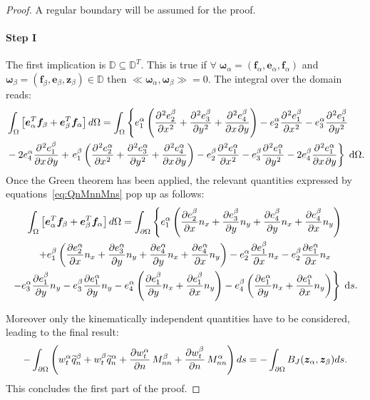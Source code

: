 \documentclass[11pt]{article}
\begin{document}
	\begin{proof}
		A regular boundary will be assumed for the proof.
		\paragraph{\textbf{Step I}} 
		The first implication is $\mathbb{D} \subseteq \mathbb{D}^T$. This is true if $ \forall \;\bm\omega_\alpha = (\bm{f}_\alpha, \bm{e}_\alpha, \bm{f}_\alpha)$ and $\bm\omega_\beta = (\bm{f}_\beta, \bm{e}_\beta, \bm{z}_\beta) \in \mathbb{D}$ then $\ll \bm\omega_\alpha, \bm\omega_\beta \gg = 0$. The integral over the domain reads:
		\begin{align*}
		&\int_{\Omega}  \left[ \bm{e}_\alpha^T \bm{f}_\beta + \bm{e}_\beta^T \bm{f}_\alpha \right] d\Omega
		= \int_{\Omega} \left\{ e_1^\alpha \left( \diffp[2]{e_2^\beta}{x} + \diffp[2]{e_3^\beta}{y} + \diffp{e_4^\beta}{x,y} \right) - e_2^\alpha \diffp[2]{e_1^\beta}{x} -e_3^\alpha \diffp[2]{e_1^\beta}{y} \right.\\ 
		&  - 2 e_4^\alpha \diffp{e_1^\beta}{x,y} + 
		\left. e_1^\beta \left( \diffp[2]{e_2^\alpha}{x} + \diffp[2]{e_3^\alpha}{y} + \diffp{e_4^\alpha}{x,y} \right) - e_2^\beta \diffp[2]{e_1^\alpha}{x} -e_3^\beta \diffp[2]{e_1^\alpha}{y} - 2 e_4^\beta \diffp{e_1^\alpha}{x,y} \right\} \d{\Omega}. \\
		\end{align*}
		Once the Green theorem has been applied,  the relevant quantities expressed by equations~\eqref{eq:QnMnnMns} pop up as follows:
		\begin{multline}
		\int_{\Omega}  \left[ \bm{e}_\alpha^T \bm{f}_\beta + \bm{e}_\beta^T \bm{f}_\alpha \right] d\Omega = \int_{\partial \Omega}  \left\{ e_1^\alpha \left( \diffp{e_2^\beta}{x} n_x + \diffp{e_3^\beta}{y} n_y +\diffp{e_4^\beta}{y} n_x + \diffp{e_4^\beta}{x} n_y \right) \right. \\
		\left.   + e_1^\beta \left( \diffp{e_2^\alpha}{x} n_x + \diffp{e_3^\alpha}{y} n_y +\diffp{e_4^\alpha}{y} n_x + \diffp{e_4^\alpha}{x} n_y \right) - e_2^\alpha \diffp{e_1^\beta}{x} n_x - e_2^\beta \diffp{e_1^\alpha}{x} n_x   \right.\\
		\left. - e_3^\alpha \diffp{e_1^\beta}{y} n_y  - e_3^\beta \diffp{e_1^\alpha}{y} n_y  - e_4^\alpha \left( \diffp{e_1^\beta}{y} n_x + \diffp{e_1^\beta}{x} n_y \right) - e_4^\beta \left( \diffp{e_1^\alpha}{y} n_x + \diffp{e_1^\alpha}{x} n_y \right) \right\} \d{s}. 
		\end{multline}
		
		Moreover only the kinematically independent quantities have to be considered, leading to the final result:
		\begin{equation}
		- \int_{\partial \Omega} \left( w_t^\alpha \widetilde{q}_n^\beta + w_t^\beta \widetilde{q}_n^\alpha + \diffp{w_t^\alpha}{n} \, M_{nn}^\beta + \diffp{w_t^\beta}{n} \, M_{nn}^\alpha \right) ds =  - \int_{\partial \Omega}  B_J(\bm{z}_\alpha, \bm{z}_\beta) ds.
		\end{equation}		
		This concludes the first part of the proof.

\end{proof}
\end{document}
